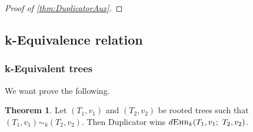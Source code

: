 \documentclass[12pt,notitlepage,a4paper]{article}
\theoremstyle{definition}
\newtheorem{theorem}{Theorem}[section]
\newcommand{\ehr}{\textsc{Ehr}}
\begin{document}
\begin{proof}[Proof of \cref{thm:DuplicatorAux}]
%		
%		
%	
\end{proof}



\subsection{k-Equivalence relation}


\subsubsection{k-Equivalent trees} \label{sect:equivtrees}



We want prove the following.

\begin{theorem} \label{thm:equivalenttrees} 
	Let $(T_1,v_1)$ and $(T_2,v_2)$ be rooted trees such
	that $(T_1,v_1)\sim_k (T_2,v_2)$.
	Then Duplicator wins
	$d\ehr_{k}(T_1,v_1;\, \, T_2,v_2)$.
\end{theorem}
\end{document}

